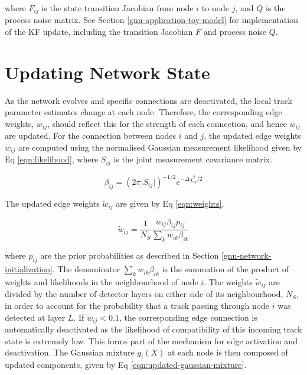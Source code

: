 where $F_{ij}$ is the state transition Jacobian from node $i$ to node $j$, and $Q$ is the process noise matrix. See Section \ref{gnn-application-toy-model} for implementation of the KF update, including the transition Jacobian $F$ and process noise $Q$. 






\section{Updating Network State}
\label{gnn-updating-network-state}

As the network evolves and specific connections are deactivated, the local track parameter estimates change at each node. Therefore, the corresponding edge weights, $w_{ij}$, should reflect this for the strength of each connection, and hence $w_{ij}$ are updated. For the connection between nodes $i$ and $j$, the updated edge weights $\widetilde{w}_{ij}$ are computed using the normalised Gaussian measurement likelihood given by Eq \eqref{eqn:likelihood}, where $S_{ij}$ is the joint measurement covariance matrix.

\begin{equation}
\beta_{ij} = (2 \pi \lvert S_{ij} \rvert )^{-1/2}  e^{-\Delta \chi^{2}_{ij} / 2}
\label{eqn:likelihood}
\end{equation}


The updated edge weights $\widetilde{w}_{ij}$ are given by Eq \eqref{eqn:weights}, 

\begin{equation}
\widetilde{w}_{ij} = \frac{1}{N_S} \frac{w_{ij}\beta_{ij} p_{ij}}{\sum_{k}w_{ik}\beta_{ik}}
\label{eqn:weights}
\end{equation}


where $p_{ij}$ are the prior probabilities as described in Section \ref{gnn-network-initialization}. The denominator $\sum_{k}w_{ik}\beta_{ik}$ is the summation of the product of weights and likelihoods in the neighbourhood of node $i$. The weights $\widetilde{w}_{ij}$ are divided by the number of detector layers on either side of its neighbourhood, $N_S$, in order to account for the probability that a track passing through node $i$ was detected at layer $L$. If $\widetilde{w}_{ij} < 0.1$, the corresponding edge connection is automatically deactivated as the likelihood of compatibility of this incoming track state is extremely low. This forms part of the mechanism for edge activation and deactivation. The Gaussian mixture $g_i(X)$ at each node is then composed of updated components, given by Eq \eqref{eqn:updated-gaussian-mixture}.

